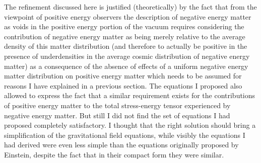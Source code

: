 \documentclass[notitlepage,12pt]{report}
\begin{document}
The refinement discussed here is justified (theoretically) by the fact that from the viewpoint of positive energy observers the description of negative energy matter as voids in the positive energy portion of the vacuum requires considering the contribution of negative energy matter as being merely relative to the average density of this matter distribution (and therefore to actually be positive in the presence of underdensities in the average cosmic distribution of negative energy matter) as a consequence of the absence of effects of a uniform negative energy matter distribution on positive energy matter which needs to be assumed for reasons I have explained in a previous section. The equations I proposed also allowed to express the fact that a similar requirement exists for the contributions of positive energy matter to the total stress-energy tensor experienced by negative energy matter. But still I did not find the set of equations I had proposed completely satisfactory. I thought that the right solution should bring a simplification of the gravitational field equations, while visibly the equations I had derived were even less simple than the equations originally proposed by Einstein, despite the fact that in their compact form they were similar.
\end{document}
